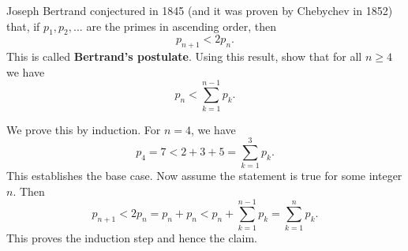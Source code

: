 \documentclass[11pt,dvipsnames]{book}
\numberwithin{equation}{section} %
\numberwithin{figure}{section} %
\numberwithin{table}{section} %
\begin{document}
\begin{exercise} Joseph Bertrand conjectured in 1845 (and it was proven by Chebychev in 1852) that, if $p_{1},p_{2},...$ are the primes in ascending order, then
\[
p_{n+1}<2p_{n}.
\]
This is called {\bf Bertrand's postulate}. Using this result, show that for all $n\geq 4$ we have 
\[
p_{n} <\sum_{k=1}^{n-1} p_{k}.
\]
\begin{solution}
We prove this by induction. For $n=4$, we have 
\[
p_{4}=7 < 2+3+5 = \sum_{k=1}^{3} p_{k}.
\]
This establishes the base case. Now assume the statement is true for some integer $n$. Then
\[
p_{n+1}<2p_{n} = p_{n}+p_{n} < p_{n}+\sum_{k=1}^{n-1} p_{k} = \sum_{k=1}^{n} p_{k}.
\]
This proves the induction step and hence the claim. 
\end{solution}
\end{exercise}
\end{document}
